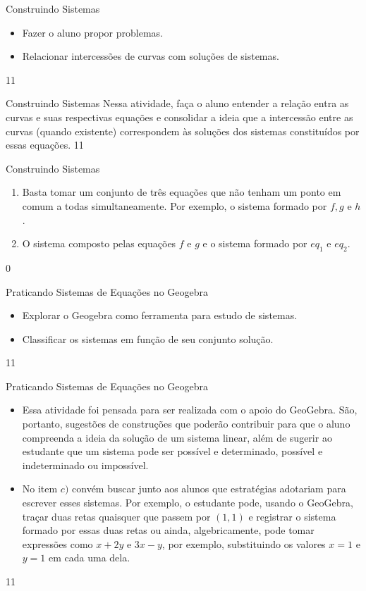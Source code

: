 \clearmargin
\def\currentcolor{session2}
\begin{objectives}{Construindo Sistemas}
{
\begin{itemize}
\item Fazer o aluno propor problemas.
\item Relacionar intercessões de curvas com soluções de sistemas. 
\end{itemize}
}{1}{1}
\end{objectives}
\marginpar{\vspace{-2em}}
\begin{sugestions}{Construindo Sistemas}
{
Nessa atividade, faça o aluno entender a relação entra as curvas e suas respectivas equações e consolidar a ideia que a intercessão entre as curvas (quando existente) correspondem às soluções dos sistemas constituídos por essas equações. 
}{1}{1}
\end{sugestions}
\begin{answer}{Construindo Sistemas}
{
\begin{enumerate}
\item Basta tomar um conjunto de três equações que não tenham um ponto em comum a todas simultaneamente. Por exemplo, o sistema formado por $f, g$ e $h$.
\item O sistema composto pelas equações $f$ e $g$ e o sistema formado por $eq_1$ e $eq_2$.
\end{enumerate}
}{0}
\end{answer}
\begin{objectives}{Praticando Sistemas de Equações no Geogebra}
{
\begin{itemize}
\item Explorar o Geogebra como ferramenta para estudo de sistemas.
\item Classificar os sistemas em função de seu conjunto solução. 
\end{itemize}
}{1}{1}
\end{objectives}
\marginpar{\vspace{-2em}}
\begin{sugestions}{Praticando Sistemas de Equações no Geogebra}
{
\begin{itemize}
\item Essa atividade foi pensada para ser realizada com o apoio do GeoGebra. São, portanto, sugestões de construções que poderão contribuir para que o aluno compreenda a ideia da solução de um sistema linear, além de sugerir ao estudante que  um sistema pode ser possível e determinado, possível e indeterminado ou impossível.
\item No item $c)$ convém buscar junto aos alunos que estratégias adotariam para escrever esses sistemas. Por exemplo, o estudante pode, usando o GeoGebra, traçar duas retas quaisquer que passem por $(1,1)$ e registrar o sistema formado por essas duas retas ou ainda, algebricamente, pode tomar expressões como $x + 2y$ e $3x-y$, por exemplo, substituindo os valores $x=1$ e $y=1$ em cada uma dela.
\end{itemize}
}{1}{1}
\end{sugestions}
